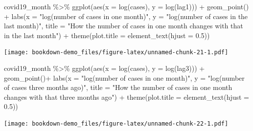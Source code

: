 \documentclass[
]{book}
\newenvironment{Shaded}{\begin{snugshade}}{\end{snugshade}}
\newcommand{\AttributeTok}[1]{\textcolor[rgb]{0.77,0.63,0.00}{#1}}
\newcommand{\FloatTok}[1]{\textcolor[rgb]{0.00,0.00,0.81}{#1}}
\newcommand{\FunctionTok}[1]{\textcolor[rgb]{0.00,0.00,0.00}{#1}}
\newcommand{\NormalTok}[1]{#1}
\newcommand{\SpecialCharTok}[1]{\textcolor[rgb]{0.00,0.00,0.00}{#1}}
\newcommand{\StringTok}[1]{\textcolor[rgb]{0.31,0.60,0.02}{#1}}
\begin{document}
\begin{Shaded}
\begin{Highlighting}[]
\NormalTok{covid19\_month }\SpecialCharTok{\%\textgreater{}\%}
  \FunctionTok{ggplot}\NormalTok{(}\FunctionTok{aes}\NormalTok{(}\AttributeTok{x =} \FunctionTok{log}\NormalTok{(cases), }\AttributeTok{y =} \FunctionTok{log}\NormalTok{(lag1))) }\SpecialCharTok{+}
  \FunctionTok{geom\_point}\NormalTok{() }\SpecialCharTok{+}
  \FunctionTok{labs}\NormalTok{(}\AttributeTok{x =} \StringTok{"log(number of cases in one month)"}\NormalTok{, }\AttributeTok{y =} \StringTok{"log(number of cases in the last month)"}\NormalTok{, }\AttributeTok{title =} \StringTok{"How the number of cases in one month changes with that in the last month"}\NormalTok{) }\SpecialCharTok{+}
  \FunctionTok{theme}\NormalTok{(}\AttributeTok{plot.title =} \FunctionTok{element\_text}\NormalTok{(}\AttributeTok{hjust =} \FloatTok{0.5}\NormalTok{))}
\end{Highlighting}
\end{Shaded}

\texttt{[image: bookdown-demo\_files/figure-latex/unnamed-chunk-21-1.pdf]}

\begin{Shaded}
\begin{Highlighting}[]
\NormalTok{covid19\_month }\SpecialCharTok{\%\textgreater{}\%}
  \FunctionTok{ggplot}\NormalTok{(}\FunctionTok{aes}\NormalTok{(}\AttributeTok{x =} \FunctionTok{log}\NormalTok{(cases), }\AttributeTok{y =} \FunctionTok{log}\NormalTok{(lag3))) }\SpecialCharTok{+}
  \FunctionTok{geom\_point}\NormalTok{()}\SpecialCharTok{+}
  \FunctionTok{labs}\NormalTok{(}\AttributeTok{x =} \StringTok{"log(number of cases in one month)"}\NormalTok{, }\AttributeTok{y =} \StringTok{"log(number of cases three months ago)"}\NormalTok{, }\AttributeTok{title =} \StringTok{"How the number of cases in one month changes with that three months ago"}\NormalTok{) }\SpecialCharTok{+}
  \FunctionTok{theme}\NormalTok{(}\AttributeTok{plot.title =} \FunctionTok{element\_text}\NormalTok{(}\AttributeTok{hjust =} \FloatTok{0.5}\NormalTok{))}
\end{Highlighting}
\end{Shaded}

\texttt{[image: bookdown-demo\_files/figure-latex/unnamed-chunk-22-1.pdf]}
\end{document}
